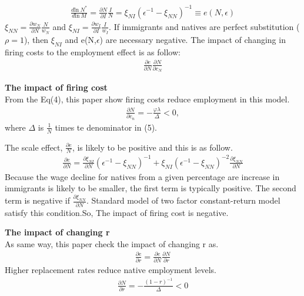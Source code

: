 \documentclass[../root]{subfiles}
\begin{document}
    \begin{align}
        \frac{d\mbox{ln} \ N^*}{d \mbox{ln} \ M}= \frac{\partial N}{\partial I}\frac{I}{N}= \xi _{NI}(\epsilon^{-1}-\xi _{NN})^{-1} \equiv e(N,\epsilon)
    \end{align}
    $\xi_{NN}=\frac{\partial w_N}{\partial N}\frac{N}{w_N}$ and $\xi_{NI}=\frac{\partial w_I}{\partial I}\frac{I}{w_I}$.
    If immigrants and natives are perfect substitution ($\rho=1$), then $\xi_{NI}$ and e(N,$\epsilon$) are necessary negative.
    The impact of changing in firing costs to the employment effect is as follow:
    \begin{align*}
        \frac{\partial e}{\partial N}\frac{\partial N}{\partial c_N} 
    \end{align*}
    
    {\bf The impact of firing cost} \\
    From the Eq(4), this paper show firing costs reduce employment in this model.
    \begin{align*}
        \frac{\partial N}{\partial c_n} = -\frac{\varphi \lambda}{\Delta}<0,
    \end{align*}
    where $\Delta$ is $\frac{1}{N}$ times te denominator in (5).

    The scale effect, $\frac{\partial e}{N}$, is likely to be positive and this is as follow.
    \begin{align*}
        \frac{\partial e}{\partial N}=\frac{\partial \xi_{NI}}{\partial N}(\epsilon^{-1}-\xi_{NN})^{-1}+ \xi_{NI}(\epsilon^{-1}-\xi_{NN})^{-2}\frac{\partial \xi_{NN}}{\partial N}
    \end{align*}
    Because the wage decline for natives from a given percentage are increase in immigrants is likely to be smaller, the first term is typically positive. The second term is negative if $\frac{\partial \xi_{NN}}{\partial N}$. Standard model of two factor constant-return model satisfy this condition.So, The impact of firing cost is negative.
    
    {\bf The impact of changing r} \\
    As same way, this paper check the impact of changing r as.
    \begin{align*}
        \frac{\partial e}{\partial r}=\frac{\partial e}{\partial N}\frac{\partial N}{\partial r}
    \end{align*}
    Higher replacement rates reduce native employment levels.
    \begin{align*}
        \frac{\partial N}{\partial r}=-\frac{(1-r)^{-1}}{\Delta}<0 
    \end{align*}
    
\end{document}
